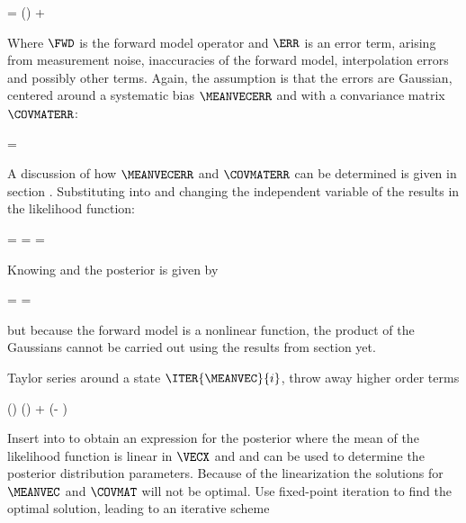     \startformula
        \VECY = \FWD(\VECX) + \ERR
    \stopformula

    Where $\FWD$ is the forward model operator and $\ERR$ is an error term,
    arising from measurement noise, inaccuracies of the forward model,
    interpolation errors and possibly other terms. Again, the assumption is
    that the errors are Gaussian, centered around a systematic bias
    $\MEANVECERR$ and with a convariance matrix $\COVMATERR$:

    \startformula
        \PROB{\ERR} = \GAUSS{\ERR}{\MEANVECERR}{\COVMATERR}
    \stopformula

    A discussion of how $\MEANVECERR$ and $\COVMATERR$ can be determined is
    given in section . Substituting 
    into  and changing the independent variable of
    the {\PDF} results in the likelihood function:
    
    \placesubformula
    \startformula
    \startalign[n=3,align={right,middle,left}]
        \NC \PROB{\VECY - \FWD(\VECX)} = \NC
            \GAUSS{\VECY - \FWD(\VECX)}{\MEANVECERR}{\COVMATERR} \NC \NR
        \NC = \NC \GAUSS{\VECY}{\FWD(\VECX)+\MEANVECERR}{\COVMATERR} \NC
            = \LIKELIHOOD {}
    \stopalign
    \stopformula

    Knowing  and  the
    posterior {\PDF} is given by

    \startformula
        \POSTERIOR
        = \frac{\LIKELIHOOD \PRIOR}{\NORMALIZATION}
        = \frac{\GAUSS{\VECY}{\FWD(\VECX) + \MEANVECERR}{\COVMATERR}
            ~\GAUSS{\VECX}{\MEANVECA}{\COVMATA}}{\NORMALIZATION} \EQCOMMA
    \stopformula

    but because the forward model is a nonlinear function, the product of the
    Gaussians cannot be carried out using the results from section
     yet.

    \startsubsection[title=An Iterative Solution]

        Taylor series around a state $\ITER{\MEANVEC}{i}$, throw away higher order
        terms

        \startformula
            \FWD(\VECX) \approx \FWD()
                +  (\VECX - )
        \stopformula

        Insert into  to obtain an expression for
        the posterior where the mean of the likelihood function is linear in
        $\VECX$ and  and  can be used to
        determine the posterior distribution parameters. Because of the
        linearization the solutions for $\MEANVEC$ and $\COVMAT$ will not be
        optimal. Use fixed-point iteration to find the optimal solution,
        leading to an iterative scheme

